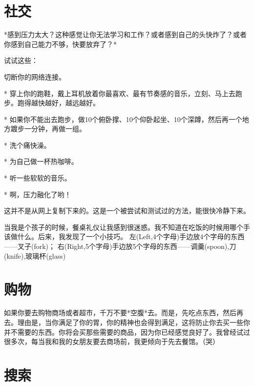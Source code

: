 \documentclass[12pt,oneside]{book}
\begin{document}
\chapter{社交}
\begin{proposition}[缓解压力]
*感到压力太大？这种感觉让你无法学习和工作？或者感到自己的头快炸了？或者你感到自己能力不够，快要放弃了？*

试试这些：

切断你的网络连接。

* 穿上你的跑鞋，戴上耳机放着你最喜欢、最有节奏感的音乐，立刻、马上去跑步。跑得越快越好，越远越好。

* 如果你不能出去跑步，做10个俯卧撑、10个仰卧起坐、10个深蹲，然后再一个地方踱步一分钟，再做一组。

* 洗个痛快澡。

* 为自己做一杯热咖啡。

* 听一些软软的音乐。

* 啊，压力融化了哟！

这并不是从网上复制下来的。这是一个被尝试和测试过的方法，能很快冷静下来。
\end{proposition}

\begin{proposition}[西餐礼仪]
	当我是个孩子的时候，餐桌礼仪让我感到很迷惑。我不知道在吃饭的时候用哪个手该做什么。后来，我发现了一个小技巧。
	左(Left,4个字母)手边放4个字母的东西——叉子(fork)；
	右(Right,5个字母)手边放5个字母的东西——调羹(spoon),刀(knife),玻璃杯(glass)
	
\end{proposition}
\chapter{购物}
\begin{proposition}[购物须知]
	如果你要去购物商场或者超市，千万不要*空腹*去。而是，先吃点东西，然后再去。理由是，当你满足了你的胃，你的精神也会得到满足，这将防止你去买一些你并不需要的东西。你将会买那些需要的商品，因为你已经感觉良好了。我曾经试过很多次，每当我和我的女朋友要去商场前，我更倾向于先去餐馆。（哭）
\end{proposition}
\chapter{搜索}
\end{document}
